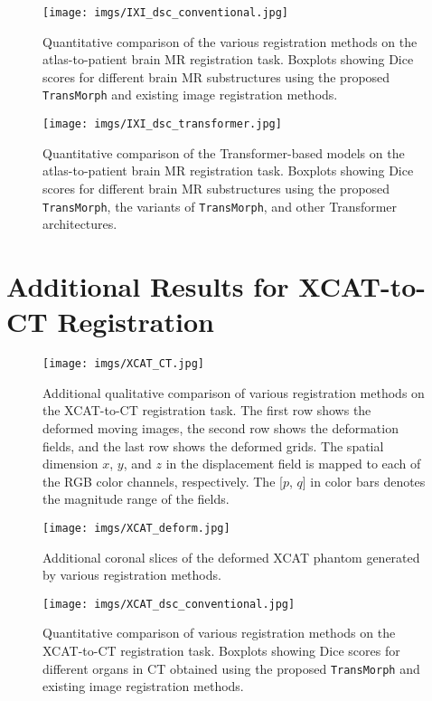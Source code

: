 \documentclass[times,twocolumn,final]{elsarticle}
\begin{document}
\newpage
\begin{figure*}[!htp]
\centering
\texttt{[image: imgs/IXI\_dsc\_conventional.jpg]}
\caption{Quantitative comparison of the various registration methods on the atlas-to-patient brain MR registration task. Boxplots showing Dice scores for different brain MR substructures using the proposed \texttt{TransMorph} and existing image registration methods. \label{fig:IXI_brain_conventional}}
\end{figure*}

\begin{figure*}[!htp]
\centering
\texttt{[image: imgs/IXI\_dsc\_transformer.jpg]}
\caption{Quantitative comparison of the Transformer-based models on the atlas-to-patient brain MR registration task. Boxplots showing Dice scores for different brain MR substructures using the proposed \texttt{TransMorph}, the variants of \texttt{TransMorph}, and other Transformer architectures.\label{fig:IXI_brain_transformer}}
\end{figure*}

\newpage
\section{Additional Results for XCAT-to-CT Registration}
\label{sec:add_xcat_ct}
\begin{figure*}[!htp]
\centering
\texttt{[image: imgs/XCAT\_CT.jpg]}
\caption{Additional qualitative comparison of various registration methods on the XCAT-to-CT registration task. The first row shows the deformed moving images, the second row shows the deformation fields, and the last row shows the deformed grids. The spatial dimension $x$, $y$, and $z$ in the displacement field is mapped to each of the RGB color channels, respectively. The [$p$, $q$] in color bars denotes the magnitude range of the fields.\label{fig:xcat_CT}}
\end{figure*}

\newpage
\begin{figure*}[!htp]
\centering
\texttt{[image: imgs/XCAT\_deform.jpg]}
\caption{Additional coronal slices of the deformed XCAT phantom generated by various registration methods. \label{fig:xcat_deform}}
\end{figure*}

\begin{figure*}[!htp]
\centering
\texttt{[image: imgs/XCAT\_dsc\_conventional.jpg]}
\caption{Quantitative comparison of various registration methods on the XCAT-to-CT registration task. Boxplots showing Dice scores for different organs in CT obtained using the proposed \texttt{TransMorph} and existing image registration methods.\label{fig:xcat_brain_conventional}}
\end{figure*}
\end{document}
